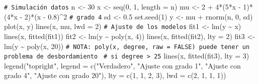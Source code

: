 \documentclass[
]{book}
\newenvironment{Shaded}{\begin{snugshade}}{\end{snugshade}}
\newcommand{\AttributeTok}[1]{\textcolor[rgb]{0.77,0.63,0.00}{#1}}
\newcommand{\CommentTok}[1]{\textcolor[rgb]{0.56,0.35,0.01}{\textit{#1}}}
\newcommand{\DecValTok}[1]{\textcolor[rgb]{0.00,0.00,0.81}{#1}}
\newcommand{\FloatTok}[1]{\textcolor[rgb]{0.00,0.00,0.81}{#1}}
\newcommand{\FunctionTok}[1]{\textcolor[rgb]{0.00,0.00,0.00}{#1}}
\newcommand{\NormalTok}[1]{#1}
\newcommand{\OtherTok}[1]{\textcolor[rgb]{0.56,0.35,0.01}{#1}}
\newcommand{\SpecialCharTok}[1]{\textcolor[rgb]{0.00,0.00,0.00}{#1}}
\newcommand{\StringTok}[1]{\textcolor[rgb]{0.31,0.60,0.02}{#1}}
\theoremstyle{break}
\theoremstyle{nonumberplain}
\renewcommand{\CommentTok}[1]{\textcolor[rgb]{0.41,0.41,0.41}{\texttt{#1}}}
\begin{document}
\begin{Shaded}
\begin{Highlighting}[]
\CommentTok{\# Simulación datos}
\NormalTok{n }\OtherTok{\textless{}{-}} \DecValTok{30}
\NormalTok{x }\OtherTok{\textless{}{-}} \FunctionTok{seq}\NormalTok{(}\DecValTok{0}\NormalTok{, }\DecValTok{1}\NormalTok{, }\AttributeTok{length =}\NormalTok{ n)}
\NormalTok{mu }\OtherTok{\textless{}{-}} \DecValTok{2} \SpecialCharTok{+} \DecValTok{4}\SpecialCharTok{*}\NormalTok{(}\DecValTok{5}\SpecialCharTok{*}\NormalTok{x }\SpecialCharTok{{-}} \DecValTok{1}\NormalTok{)}\SpecialCharTok{*}\NormalTok{(}\DecValTok{4}\SpecialCharTok{*}\NormalTok{x }\SpecialCharTok{{-}} \DecValTok{2}\NormalTok{)}\SpecialCharTok{*}\NormalTok{(x }\SpecialCharTok{{-}} \FloatTok{0.8}\NormalTok{)}\SpecialCharTok{\^{}}\DecValTok{2} \CommentTok{\# grado 4}
\NormalTok{sd }\OtherTok{\textless{}{-}} \FloatTok{0.5}
\FunctionTok{set.seed}\NormalTok{(}\DecValTok{1}\NormalTok{)}
\NormalTok{y }\OtherTok{\textless{}{-}}\NormalTok{ mu }\SpecialCharTok{+} \FunctionTok{rnorm}\NormalTok{(n, }\DecValTok{0}\NormalTok{, sd)}
\FunctionTok{plot}\NormalTok{(x, y) }
\FunctionTok{lines}\NormalTok{(x, mu, }\AttributeTok{lwd =} \DecValTok{2}\NormalTok{)}
\CommentTok{\# Ajuste de los modelos}
\NormalTok{fit1 }\OtherTok{\textless{}{-}} \FunctionTok{lm}\NormalTok{(y }\SpecialCharTok{\textasciitilde{}}\NormalTok{ x)}
\FunctionTok{lines}\NormalTok{(x, }\FunctionTok{fitted}\NormalTok{(fit1))}
\NormalTok{fit2 }\OtherTok{\textless{}{-}} \FunctionTok{lm}\NormalTok{(y }\SpecialCharTok{\textasciitilde{}} \FunctionTok{poly}\NormalTok{(x, }\DecValTok{4}\NormalTok{))}
\FunctionTok{lines}\NormalTok{(x, }\FunctionTok{fitted}\NormalTok{(fit2), }\AttributeTok{lty =} \DecValTok{2}\NormalTok{)}
\NormalTok{fit3 }\OtherTok{\textless{}{-}} \FunctionTok{lm}\NormalTok{(y }\SpecialCharTok{\textasciitilde{}} \FunctionTok{poly}\NormalTok{(x, }\DecValTok{20}\NormalTok{)) }
\CommentTok{\# NOTA: poly(x, degree, raw = FALSE) puede tener un problema de desbordamiento }
\CommentTok{\# si degree \textgreater{} 25}
\FunctionTok{lines}\NormalTok{(x, }\FunctionTok{fitted}\NormalTok{(fit3), }\AttributeTok{lty =} \DecValTok{3}\NormalTok{)}
\FunctionTok{legend}\NormalTok{(}\StringTok{"topright"}\NormalTok{, }\AttributeTok{legend =} \FunctionTok{c}\NormalTok{(}\StringTok{"Verdadero"}\NormalTok{, }\StringTok{"Ajuste con grado 1"}\NormalTok{, }
                              \StringTok{"Ajuste con grado 4"}\NormalTok{, }\StringTok{"Ajuste con grado 20"}\NormalTok{), }
       \AttributeTok{lty =} \FunctionTok{c}\NormalTok{(}\DecValTok{1}\NormalTok{, }\DecValTok{1}\NormalTok{, }\DecValTok{2}\NormalTok{, }\DecValTok{3}\NormalTok{), }\AttributeTok{lwd =} \FunctionTok{c}\NormalTok{(}\DecValTok{2}\NormalTok{, }\DecValTok{1}\NormalTok{, }\DecValTok{1}\NormalTok{, }\DecValTok{1}\NormalTok{))}
\end{Highlighting}
\end{Shaded}
\end{document}
